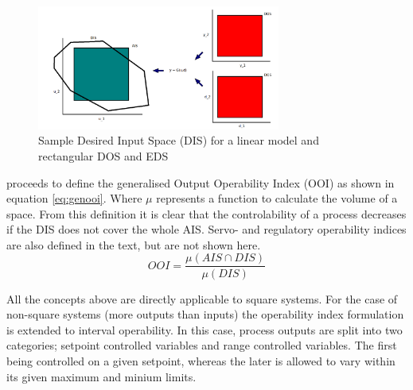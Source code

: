 \begin{figure}[htbp]
  \centering
  \includegraphics[width=8cm]{graph/sample_dis}
  \caption[Sample Desired Input Space]{Sample Desired Input Space (DIS) for
    a linear model and rectangular DOS and EDS}
  \label{fig:sampledis}
\end{figure}

\citet{vinsonphd} proceeds to define the generalised Output Operability Index
(OOI) as shown in equation \ref{eq:genooi}. Where $\mu$ represents a function
to calculate the volume of a space. From this definition it is clear that the
controlability of a process decreases if the DIS does not cover the whole AIS.
Servo- and regulatory operability indices are also defined in the text, but 
are not shown here.
\begin{equation}
  \label{eq:genooi}
     OOI = \frac{\mu(AIS\cap DIS)}{\mu(DIS)}
\end{equation}

All the concepts above are directly applicable to square systems. For the case
of non-square systems (more outputs than inputs) the operability index
formulation is extended to interval operability. In this case, process outputs
are split into two categories; setpoint controlled variables and range
controlled variables. The first being controlled on a given setpoint, whereas 
the later is allowed to vary within its given maximum and minium limits.

